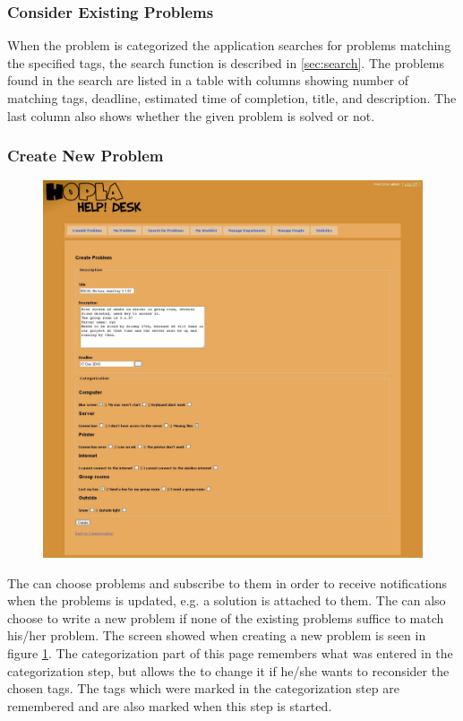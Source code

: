 \subsubsection{Consider Existing Problems}
\label{ssu:consider}
When the problem is categorized the application searches for problems matching the specified tags, the search function is described in \ref{sec:search}.
The problems found in the search are listed in a table with columns showing number of matching tags, deadline, estimated time of completion, title, and description.
The last column also shows whether the given problem is solved or not.

\subsubsection{Create New Problem}
\begin{figure}[p]
	\centering
		\includegraphics[width=1.00\textwidth, clip=true, trim=2.9cm 0.5cm 15cm 8cm]{input/implementation/program_presentation/newProblem.png}
	\label{fig:newProblem}
\end{figure}
The \aclient[] can choose problems and subscribe to them in order to receive notifications when the problems is updated, e.g. a solution is attached to them.
The \aclient[] can also choose to write a new problem if none of the existing problems suffice to match his/her problem.
The screen showed when creating a new problem is seen in figure \ref{fig:newProblem}.
The categorization part of this page remembers what was entered in the categorization step, but allows the \aclient[] to change it if he/she wants to reconsider the chosen tags.
The tags which were marked in the categorization step are remembered and are also marked when this step is started.


